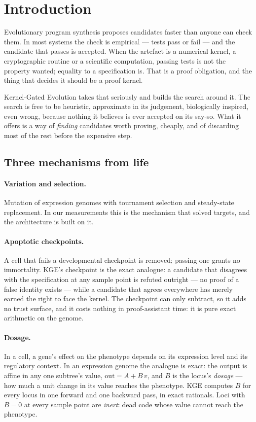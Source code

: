 \documentclass[11pt,a4paper]{article}
\theoremstyle{definition}
\theoremstyle{remark}
\begin{document}
\tableofcontents

\section{Introduction}

Evolutionary program synthesis proposes candidates faster than anyone can check
them. In most systems the check is empirical --- tests pass or fail --- and the
candidate that passes is accepted. When the artefact is a numerical kernel, a
cryptographic routine or a scientific computation, passing tests is not the
property wanted; equality to a specification is. That is a proof obligation, and
the thing that decides it should be a proof kernel.

Kernel-Gated Evolution takes that seriously and builds the search around it. The
search is free to be heuristic, approximate in its judgement, biologically
inspired, even wrong, because nothing it believes is ever accepted on its say-so.
What it offers is a way of \emph{finding} candidates worth proving, cheaply, and
of discarding most of the rest before the expensive step.

\subsection{Three mechanisms from life}

\paragraph{Variation and selection.} Mutation of expression genomes with
tournament selection and steady-state replacement. In our measurements this is
the mechanism that solved targets, and the architecture is built on it.

\paragraph{Apoptotic checkpoints.} A cell that fails a developmental checkpoint
is removed; passing one grants no immortality. KGE's checkpoint is the exact
analogue: a candidate that disagrees with the specification at any sample point
is refuted outright --- no proof of a false identity exists --- while a candidate
that agrees everywhere has merely earned the right to face the kernel. The
checkpoint can only subtract, so it adds no trust surface, and it costs nothing
in proof-assistant time: it is pure exact arithmetic on the genome.

\paragraph{Dosage.} In a cell, a gene's effect on the phenotype depends on its
expression level and its regulatory context. In an expression genome the analogue
is exact: the output is affine in any one subtree's value, $\text{out} = A + B\,v$,
and $B$ is the locus's \emph{dosage} --- how much a unit change in its value
reaches the phenotype. KGE computes $B$ for every locus in one forward and one
backward pass, in exact rationals. Loci with $B=0$ at every sample point are
\emph{inert}: dead code whose value cannot reach the phenotype.
\end{document}
